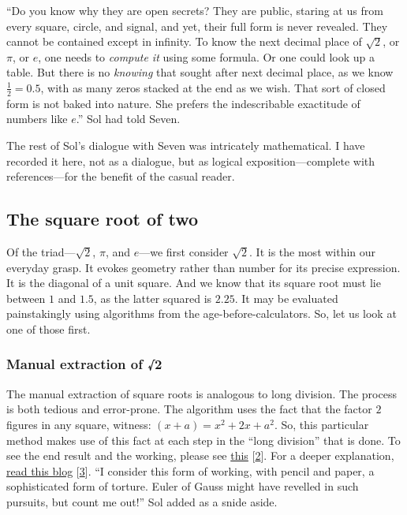 \documentclass[
  a4paper,
]{article}
\begin{document}
``Do you know why they are open secrets? They are public, staring at us
from every square, circle, and signal, and yet, their full form is never
revealed. They cannot be contained except in infinity. To know the next
decimal place of \(\sqrt{2}\), or \(\pi\), or \(e\), one needs to
\emph{compute it} using some formula. Or one could look up a table. But
there is no \emph{knowing} that sought after next decimal place, as we
know \(\frac{1}{2} = 0.5\), with as many zeros stacked at the end as we
wish. That sort of closed form is not baked into nature. She prefers the
indescribable exactitude of numbers like \(e\).'' Sol had told Seven.

The rest of Sol's dialogue with Seven was intricately mathematical. I
have recorded it here, not as a dialogue, but as logical
exposition---complete with references---for the benefit of the casual
reader.

\hypertarget{the-square-root-of-two}{%
\subsection{The square root of two}\label{the-square-root-of-two}}

Of the triad---\(\sqrt{2}\), \(\pi\), and \(e\)---we first consider
\(\sqrt{2}\). It is the most within our everyday grasp. It evokes
geometry rather than number for its precise expression. It is the
diagonal of a unit square. And we know that its square root must lie
between \(1\) and \(1.5\), as the latter squared is \(2.25\). It may be
evaluated painstakingly using algorithms from the
age-before-calculators. So, let us look at one of those first.

\hypertarget{manual-extraction-of-2}{%
\subsubsection{Manual extraction of √2}\label{manual-extraction-of-2}}

The manual extraction of square roots is analogous to long division. The
process is both tedious and error-prone. The algorithm uses the fact
that the factor \(2\) figures in any square, witness:
\((x + a) = x^2 + 2x +a^2\). So, this particular method makes use of
this fact at each step in the ``long division'' that is done. To see the
end result and the working, please see
\href{https://www.cuemath.com/algebra/square-root-of-2/}{this}
{[}\protect\hyperlink{ref-cuemathsqrt}{2}{]}. For a deeper explanation,
\href{https://www.cantorsparadise.com/the-square-root-algorithm-f97ab5c29d6d}{read
this blog} {[}\protect\hyperlink{ref-ujjwalsingh2021}{3}{]}. ``I
consider this form of working, with pencil and paper, a sophisticated
form of torture. Euler of Gauss might have revelled in such pursuits,
but count me out!'' Sol added as a snide aside.
\end{document}
